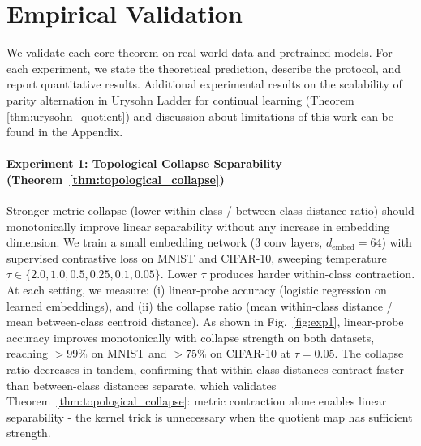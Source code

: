 \documentclass{article}
\newtheorem{remark}{Remark}
\begin{document}

\section{Empirical Validation}
\label{sec:empirical}
 
We validate each core theorem on real-world data and pretrained models. For each experiment, we state the theoretical prediction, describe the protocol, and report quantitative results. Additional experimental results on the scalability of parity alternation in Urysohn Ladder for continual learning (Theorem \ref{thm:urysohn_quotient}) and discussion about limitations of this work can be found in the Appendix. %
 

 
\paragraph{Experiment 1: Topological Collapse Separability (Theorem~\ref{thm:topological_collapse})}
Stronger metric collapse (lower within-class / between-class distance ratio) should monotonically improve linear separability without any increase in embedding dimension.
We train a small embedding network (3 conv layers, $d_{\mathrm{embed}}{=}64$) with supervised contrastive loss \cite{khosla2020supervised} on MNIST and CIFAR-10, sweeping temperature $\tau \in \{2.0, 1.0, 0.5, 0.25, 0.1, 0.05\}$. Lower $\tau$ produces harder within-class contraction. At each setting, we measure: (i) linear-probe accuracy (logistic regression on learned embeddings), and (ii) the collapse ratio (mean within-class distance / mean between-class centroid distance).
As shown in Fig.~\ref{fig:exp1}, linear-probe accuracy improves monotonically with collapse strength on both datasets, reaching $>99\%$ on MNIST and $>75\%$ on CIFAR-10 at $\tau{=}0.05$. The collapse ratio decreases in tandem, confirming that within-class distances contract faster than between-class distances separate, which validates Theorem~\ref{thm:topological_collapse}: metric contraction alone enables linear separability - the kernel trick is unnecessary when the quotient map has sufficient strength.
 
\end{document}
